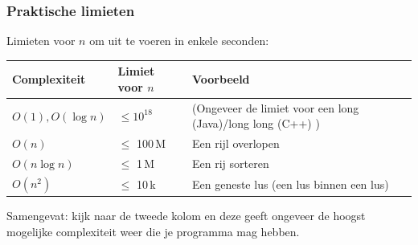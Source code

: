 \documentclass[12pt]{beamer}
\begin{document}
\begin{frame}
\frametitle{Praktische limieten}
Limieten voor $n$ om uit te voeren in enkele seconden:
\begin{center}
\begin{tabu}{lll}
    \toprule
    Complexiteit & Limiet voor $n$ & Voorbeeld \\
    \midrule
    $O(1), O(\log n)$ & $\leq 10^{18}$ & (Ongeveer de limiet voor een long (Java)/long long (C++) ) \\
    $O(n)$ & $\leq$ 100\,M & Een rijl overlopen \\
    $O(n\log n)$ & $\leq$ 1\,M &  Een rij sorteren \\
    $O(n^2)$ & $\leq$ 10\,k & Een geneste lus (een lus binnen een lus) \\
    \bottomrule
\end{tabu}
\end{center}
Samengevat: kijk naar de tweede kolom en deze geeft ongeveer de hoogst mogelijke complexiteit weer die je programma mag hebben.
\end{frame}
\end{document}
